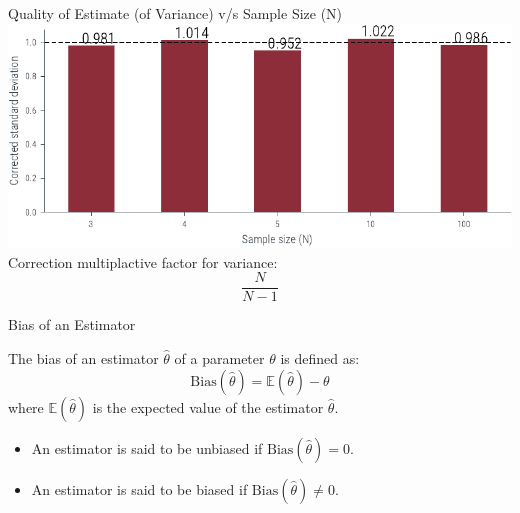 \documentclass[handout]{beamer}
\begin{document}
\begin{frame}{Quality of Estimate (of Variance) v/s Sample Size (N)}
    \includegraphics[width=\textwidth]{../figures/corrected-mle-variance-quality.pdf}
Correction multiplactive factor for variance:
\[
    \frac{N}{N-1}
\]
\end{frame}
    

\begin{frame}{Bias of an Estimator}
    \begin{tcolorbox}[colback=metropolisblue!5,colframe=metropolisblue,title=Bias of an Estimator]
        The bias of an estimator $\hat{\theta}$ of a parameter $\theta$ is defined as:
        \[
            \text{Bias}(\hat{\theta}) = \mathbb{E}(\hat{\theta}) - \theta
        \]
        where $\mathbb{E}(\hat{\theta})$ is the expected value of the estimator $\hat{\theta}$.
    \end{tcolorbox}
    \begin{itemize}
        \item An estimator is said to be unbiased if $\text{Bias}(\hat{\theta}) = 0$.
        \item An estimator is said to be biased if $\text{Bias}(\hat{\theta}) \neq 0$.
    \end{itemize}
    
\end{frame}
\end{document}
